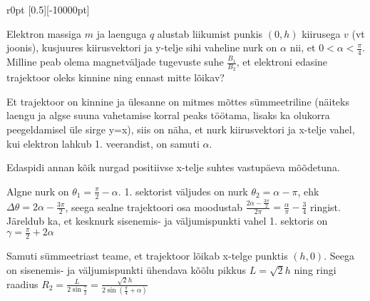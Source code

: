 
\begin{wrapfigure}{r}{0pt}
    \vspace{-50pt}
    \raisebox{-50pt}[0.5\dimexpr\height][-10000pt]{\magnetvali{}}    
    \vspace{-500pt}
\end{wrapfigure}



Elektron massiga $m$ ja laenguga $q$ alustab liikumist punkis $(0,h)$ kiirusega $v$ (vt joonis), kusjuures kiirusvektori ja y-telje sihi vaheline nurk on $\alpha$ nii, et $0<\alpha<\frac{\pi}{4}$. Milline peab olema magnetväljade tugevuste suhe $\frac{B_1}{B_2}$, et elektroni edasine trajektoor oleks kinnine ning ennast mitte lõikav?


\hint

\solu
Et trajektoor on kinnine ja ülesanne on mitmes mõttes sümmeetriline (näiteks laengu ja algse suuna vahetamise korral peaks töötama, lisaks ka olukorra peegeldamisel üle sirge y=x), siis on näha, et nurk kiirusvektori ja x-telje vahel, kui elektron lahkub 1. veerandist, on samuti $\alpha$.

Edaspidi annan kõik nurgad positiivse x-telje suhtes vastupäeva mõõdetuna. 

Algne nurk on $\theta_1 = \frac{\pi}{2} - \alpha$. 1. sektorist väljudes on nurk $\theta_2 = \alpha - \pi$, ehk $\Delta\theta = 2\alpha - \frac{3\pi}{2}$, seega sealne trajektoori osa moodustab $\frac{2\alpha-\frac{3\pi}{2}}{2\pi} = \frac{\alpha}{\pi} - \frac{3}{4}$ ringist. Järeldub ka, et kesknurk sisenemis- ja väljumispunkti vahel 1. sektoris on $\gamma = \frac{\pi}{2} + 2\alpha$

Samuti sümmeetriast teame, et trajektoor lõikab x-telge punktis $(h,0)$. Seega on sisenemis- ja väljumispunkti ühendava kõõlu pikkus $L = \sqrt{2}h$ ning ringi raadius $R_2 = \frac{L}{2\sin{\frac{\gamma}{2}}} = \frac{\sqrt{2}h}{2\sin{(\frac{\pi}{4}+\alpha)}}$



